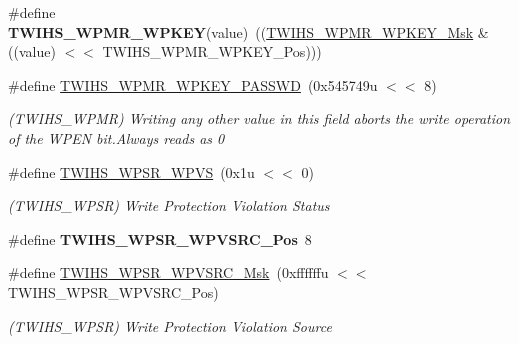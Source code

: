 \begin{DoxyCompactItemize}
\#define {\bfseries T\+W\+I\+H\+S\+\_\+\+W\+P\+M\+R\+\_\+\+W\+P\+K\+EY}(value)~((\mbox{\hyperlink{group__SAMV71__TWIHS_gad433cad3185d19b00f7c05e49cbd7e13}{T\+W\+I\+H\+S\+\_\+\+W\+P\+M\+R\+\_\+\+W\+P\+K\+E\+Y\+\_\+\+Msk}} \& ((value) $<$$<$ T\+W\+I\+H\+S\+\_\+\+W\+P\+M\+R\+\_\+\+W\+P\+K\+E\+Y\+\_\+\+Pos)))
\item 
\mbox{\label{group__SAMV71__TWIHS_ga99fd2617318e1cd366fe866630322573}} 
\#define \mbox{\hyperlink{group__SAMV71__TWIHS_ga99fd2617318e1cd366fe866630322573}{T\+W\+I\+H\+S\+\_\+\+W\+P\+M\+R\+\_\+\+W\+P\+K\+E\+Y\+\_\+\+P\+A\+S\+S\+WD}}~(0x545749u $<$$<$ 8)
\begin{DoxyCompactList}\small\item\em (T\+W\+I\+H\+S\+\_\+\+W\+P\+MR) Writing any other value in this field aborts the write operation of the W\+P\+EN bit.\+Always reads as 0 \end{DoxyCompactList}\item 
\mbox{\label{group__SAMV71__TWIHS_ga6238966d28ce45cc4ee70af09739d249}} 
\#define \mbox{\hyperlink{group__SAMV71__TWIHS_ga6238966d28ce45cc4ee70af09739d249}{T\+W\+I\+H\+S\+\_\+\+W\+P\+S\+R\+\_\+\+W\+P\+VS}}~(0x1u $<$$<$ 0)
\begin{DoxyCompactList}\small\item\em (T\+W\+I\+H\+S\+\_\+\+W\+P\+SR) Write Protection Violation Status \end{DoxyCompactList}\item 
\mbox{\label{group__SAMV71__TWIHS_ga520c6f8353b3d82140d67e67bdb3197f}} 
\#define {\bfseries T\+W\+I\+H\+S\+\_\+\+W\+P\+S\+R\+\_\+\+W\+P\+V\+S\+R\+C\+\_\+\+Pos}~8
\item 
\mbox{\label{group__SAMV71__TWIHS_gaa7dece5c12c4e3de6238432a6fb75c76}} 
\#define \mbox{\hyperlink{group__SAMV71__TWIHS_gaa7dece5c12c4e3de6238432a6fb75c76}{T\+W\+I\+H\+S\+\_\+\+W\+P\+S\+R\+\_\+\+W\+P\+V\+S\+R\+C\+\_\+\+Msk}}~(0xffffffu $<$$<$ T\+W\+I\+H\+S\+\_\+\+W\+P\+S\+R\+\_\+\+W\+P\+V\+S\+R\+C\+\_\+\+Pos)
\begin{DoxyCompactList}\small\item\em (T\+W\+I\+H\+S\+\_\+\+W\+P\+SR) Write Protection Violation Source \end{DoxyCompactList}\item 
\mbox{\label{group__SAMV71__TWIHS_gaec30559df491c073fa90dc53f3d25b96}} 

\end{DoxyCompactItemize}

